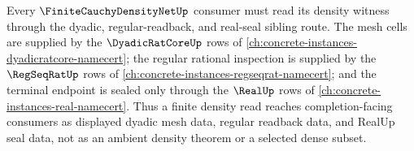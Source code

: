 Every $\FiniteCauchyDensityNetUp$ consumer must read its density witness through the dyadic, regular-readback, and real-seal sibling route. The mesh cells are supplied by the $\DyadicRatCoreUp$ rows of \autoref{ch:concrete-instances-dyadicratcore-namecert}; the regular rational inspection is supplied by the $\RegSeqRatUp$ rows of \autoref{ch:concrete-instances-regseqrat-namecert}; and the terminal endpoint is sealed only through the $\RealUp$ rows of \autoref{ch:concrete-instances-real-namecert}. Thus a finite density read reaches completion-facing consumers as displayed dyadic mesh data, regular readback data, and RealUp seal data, not as an ambient density theorem or a selected dense subset.
